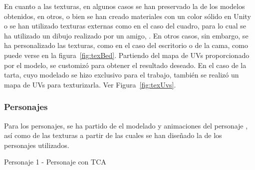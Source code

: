 \documentclass[12pt, a4paper,twoside,titlepage]{book}
\begin{document}
En cuanto a las texturas, en algunos casos se han preservado la de los modelos obtenidos, en otros, o bien se han creado materiales con un color sólido en Unity o se han utilizado texturas externas como en el caso del cuadro, para lo cual se ha utilizado un dibujo realizado por un amigo, \cite{refdibujo}. En otros casos, sin embargo, se ha personalizado las texturas, como en el caso del escritorio o de la cama, como puede verse en la figura~\ref{fig:texBed}. Partiendo del mapa de UVs proporcionado por el modelo, se customizó para obtener el resultado deseado. En el caso de la tarta, cuyo modelado se hizo exclusivo para el trabajo, también se realizó un mapa de UVs para texturizarla. Ver Figura~\ref{fig:texUvs}. 



\subsubsection{Personajes}
\label{sec:diseñoPersonajes}
Para los personajes, se ha partido de el modelado y animaciones del personaje , así como de las texturas a partir de las cuales se han diseñado la de los personajes utilizados. 

 Personaje 1 - Personaje con TCA 
 
\end{document}
